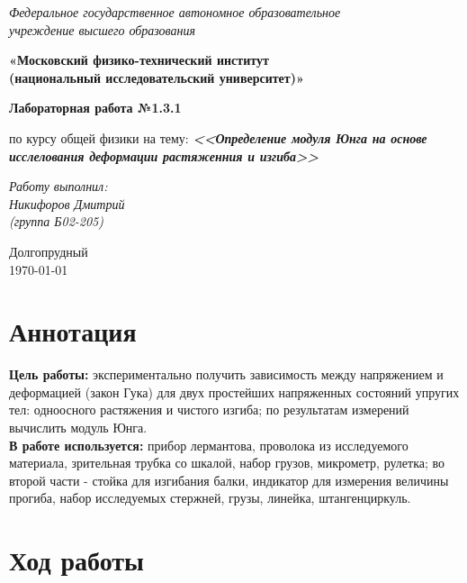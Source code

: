 \documentclass[a4paper,14pt]{extarticle}
\begin{document}
	\begin{center}
		\textit{Федеральное государственное автономное образовательное\\ учреждение высшего образования }
		
		\vspace{0.5ex}
		
		\textbf{«Московский физико-технический институт\\ (национальный исследовательский университет)»}
	\end{center}
	
	\vspace{10ex}
	
	
	\begin{center}
		\vspace{13ex}	
		\textbf{Лабораторная работа №1.3.1}	
		\vspace{1ex}
		
		по курсу общей физики		
		на тему:		
		\textbf{\textit{<<Определение модуля Юнга на основе исслелования деформации растяженния и изгиба>>}}		
		\vspace{30ex}
		
		\begin{flushright}
			\noindent
			\textit{Работу выполнил:}\\  
			\textit{Никифоров Дмитрий \\(группа Б02-205)}
		\end{flushright}
		\vfill
		Долгопрудный \\ \today
		
	\end{center}
	
	\section{Аннотация}
	\textbf{Цель работы:} экспериментально получить зависимость между напряжением и деформацией (закон Гука) для двух простейших напряженных состояний упругих тел: одноосного растяжения и чистого изгиба; по результатам измерений вычислить модуль Юнга. \\
	\textbf{В работе используется:} прибор лермантова, проволока из исследуемого материала, зрительная трубка со шкалой, набор грузов, микрометр, рулетка; во второй части - стойка для изгибания балки, индикатор для измерения величины прогиба, набор исследуемых стержней, грузы, линейка, штангенциркуль.
	\section{Ход работы}
\end{document}

